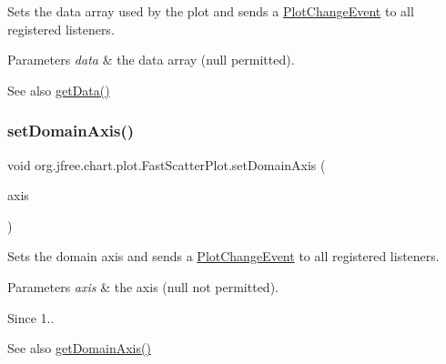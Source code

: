 Sets the data array used by the plot and sends a \mbox{\hyperlink{}{Plot\+Change\+Event}} to all registered listeners.


\begin{DoxyParams}{Parameters}
{\em data} & the data array ({\ttfamily null} permitted).\\
\hline
\end{DoxyParams}
\begin{DoxySeeAlso}{See also}
\mbox{\hyperlink{classorg_1_1jfree_1_1chart_1_1plot_1_1_fast_scatter_plot_a0c23b75056c021aac92afb38266d906b}{get\+Data()}} 
\end{DoxySeeAlso}
\mbox{\label{classorg_1_1jfree_1_1chart_1_1plot_1_1_fast_scatter_plot_aea7696ebad4c4e6c9734dc5027633384}} 
\subsubsection{\texorpdfstring{set\+Domain\+Axis()}{setDomainAxis()}}
{\footnotesize\ttfamily void org.\+jfree.\+chart.\+plot.\+Fast\+Scatter\+Plot.\+set\+Domain\+Axis (\begin{DoxyParamCaption}\item[{\mbox{\hyperlink{classorg_1_1jfree_1_1chart_1_1axis_1_1_value_axis}{Value\+Axis}}}]{axis }\end{DoxyParamCaption})}

Sets the domain axis and sends a \mbox{\hyperlink{}{Plot\+Change\+Event}} to all registered listeners.


\begin{DoxyParams}{Parameters}
{\em axis} & the axis ({\ttfamily null} not permitted).\\
\hline
\end{DoxyParams}
\begin{DoxySince}{Since}
1..
\end{DoxySince}
\begin{DoxySeeAlso}{See also}
\mbox{\hyperlink{classorg_1_1jfree_1_1chart_1_1plot_1_1_fast_scatter_plot_adce6bd628c2b1bc6a2ed816cbd63f769}{get\+Domain\+Axis()}} 
\end{DoxySeeAlso}
\mbox{\label{classorg_1_1jfree_1_1chart_1_1plot_1_1_fast_scatter_plot_af49e6d29cc7cc60458d27ace835c238d}} 
